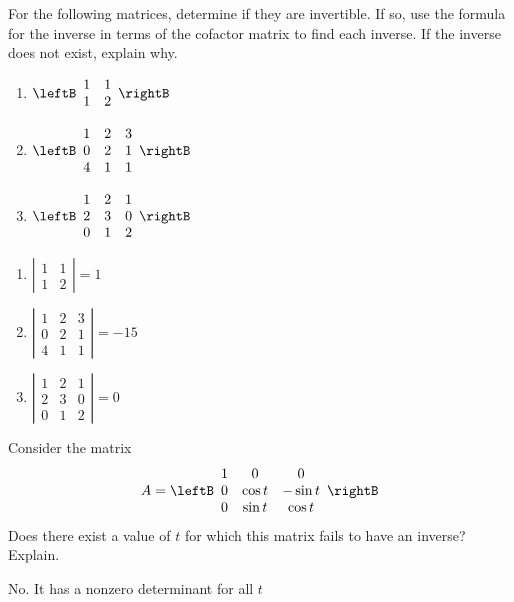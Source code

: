 \begin{enumialphparenastyle}
\begin{ex} For the following matrices, determine if they are invertible. If so, use the formula for the inverse in terms of the cofactor matrix to
find each inverse. If the inverse does not exist, explain why. 
\begin{enumerate}
\item
$\leftB
\begin{array}{rr}
1 & 1 \\
1 & 2
\end{array}
\rightB$
\item
$\leftB
\begin{array}{rrr}
1 & 2 & 3 \\
0 & 2 & 1 \\
4 & 1 & 1
\end{array}
\rightB$
\item
$\leftB
\begin{array}{rrr}
1 & 2 & 1 \\
2 & 3 & 0 \\
0 & 1 & 2
\end{array}
\rightB $
\end{enumerate}
\begin{sol}
\begin{enumerate}
\item $\left\vert
\begin{array}{cc}
1 & 1 \\
1 & 2
\end{array}
\right\vert = 1$
\item $\left\vert
\begin{array}{ccc}
1 & 2 & 3 \\
0 & 2 & 1 \\
4 & 1 & 1%
\end{array}
\right\vert = -15$
\item $\left\vert
\begin{array}{ccc}
1 & 2 & 1 \\
2 & 3 & 0 \\
0 & 1 & 2
\end{array}
\right\vert = 0$
\end{enumerate}
\end{sol}
\end{ex}

\begin{ex} Consider the matrix 
\begin{equation*}
A = 
\leftB
\begin{array}{ccc}
1 & 0 & 0 \\
0 & \cos t & -\sin t \\
0 & \sin t & \cos t
\end{array}
\rightB
\end{equation*}
Does there exist a value of $t$ for which this matrix fails to have an
inverse? Explain.
\begin{sol}
 No. It has a nonzero determinant for all $t$
\end{sol}
\end{ex}



\end{enumialphparenastyle}
